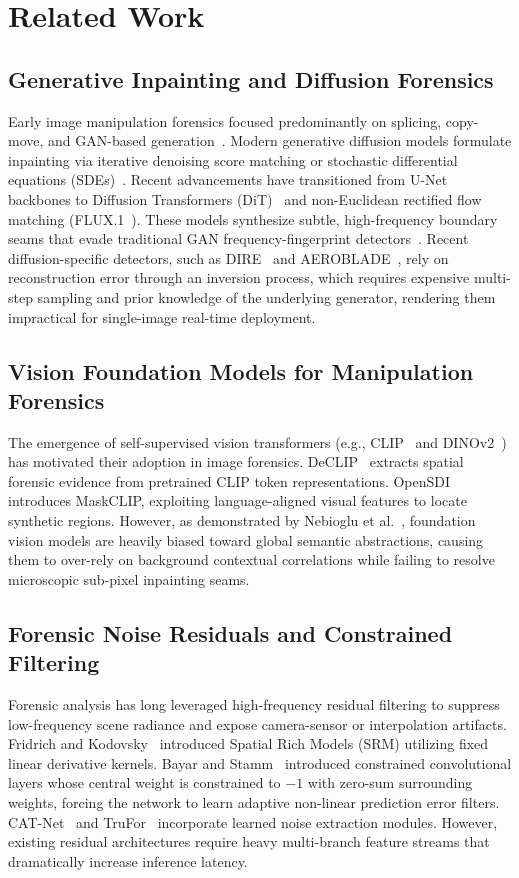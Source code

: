 \documentclass[sigconf,review=true]{acmart}
\begin{document}
\section{Related Work}
\label{sec:related}

\subsection{Generative Inpainting and Diffusion Forensics}
Early image manipulation forensics focused predominantly on splicing, copy-move, and GAN-based generation~\cite{mantranet,cnnspot,cfl}. Modern generative diffusion models formulate inpainting via iterative denoising score matching or stochastic differential equations (SDEs)~\cite{ldm}. Recent advancements have transitioned from U-Net backbones to Diffusion Transformers (DiT)~\cite{dit} and non-Euclidean rectified flow matching (FLUX.1~\cite{flux}). These models synthesize subtle, high-frequency boundary seams that evade traditional GAN frequency-fingerprint detectors~\cite{npr,freqnet}. Recent diffusion-specific detectors, such as DIRE~\cite{dire} and AEROBLADE~\cite{aeroblade}, rely on reconstruction error through an inversion process, which requires expensive multi-step sampling and prior knowledge of the underlying generator, rendering them impractical for single-image real-time deployment.

\subsection{Vision Foundation Models for Manipulation Forensics}
The emergence of self-supervised vision transformers (e.g., CLIP~\cite{clip} and DINOv2~\cite{dinov2}) has motivated their adoption in image forensics. DeCLIP~\cite{declip} extracts spatial forensic evidence from pretrained CLIP token representations. OpenSDI~\cite{opensdi} introduces MaskCLIP, exploiting language-aligned visual features to locate synthetic regions. However, as demonstrated by Nebioglu et al.~\cite{inpx}, foundation vision models are heavily biased toward global semantic abstractions, causing them to over-rely on background contextual correlations while failing to resolve microscopic sub-pixel inpainting seams.

\subsection{Forensic Noise Residuals and Constrained Filtering}
Forensic analysis has long leveraged high-frequency residual filtering to suppress low-frequency scene radiance and expose camera-sensor or interpolation artifacts. Fridrich and Kodovsky~\cite{srm} introduced Spatial Rich Models (SRM) utilizing fixed linear derivative kernels. Bayar and Stamm~\cite{bayar} introduced constrained convolutional layers whose central weight is constrained to $-1$ with zero-sum surrounding weights, forcing the network to learn adaptive non-linear prediction error filters. CAT-Net~\cite{catnet} and TruFor~\cite{trufor} incorporate learned noise extraction modules. However, existing residual architectures require heavy multi-branch feature streams that dramatically increase inference latency.
\end{document}
